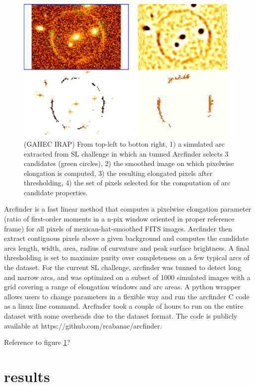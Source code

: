 \documentclass[useAMS,usenatbib]{mn2e}
\newcommand{\red}[1]{{\color{red} #1}}
\begin{document}
\begin{figure}
 \includegraphics[width=\columnwidth]{Cabanac/arcmethod.pdf}
 \caption{ (GAHEC IRAP) From top-left to botton right, 1) a simulated arc extracted from SL challenge in which an tunned Arcfinder selects 3 candidates (green circles), 2) the smoothed image on which pixelwise elongation is computed, 3) the resulting elongated pixels after thresholding, 4) the set of pixels selected for the computation of arc candidate properties. }
 \label{fig:Cabanac}
\end{figure}

Arcfinder \citep{2006astro.ph..6757A,2007A&A...461..813C,2012ApJ...749...38M} is a fast linear method that computes a pixelwise elongation parameter (ratio of first-order moments in a n-pix window oriented in proper reference frame) for all pixels of mexican-hat-smoothed FITS images. Arcfinder then extract contiguous pixels above a given background and computes the candidate arcs length, width, area, radius of curvature and peak surface brightness. A final thresholding is set to maximize purity over completeness on a few typical arcs of the dataset.
For the current SL challenge, arcfinder was tunned to detect long and narrow arcs, and was optimized on a subset of 1000 simulated images with a grid covering a range of elongation windows and arc areas.  A python wrapper allows users to change parameters in a flexible way and run the arcfinder C code as a linux line command. Arcfinder took a couple of hours to run on the entire dataset with some overheads due to the dataset format. The code is publicly available at https://github.com/rcabanac/arcfinder.

\red{Reference to figure \ref{fig:Cabanac}?}
\section{results}
\end{document}
